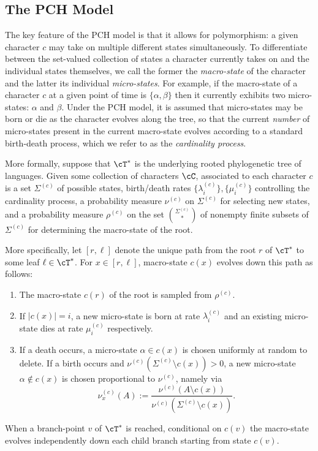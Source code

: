 \subsection{The PCH Model}

The key feature of the PCH model is that it allows for polymorphism: a given character $c$ may take on multiple different
states simultaneously. To differentiate between the set-valued collection of states a character currently takes on and the individual
states themselves, we call the former the \textit{macro-state} of the character and the latter its individual \textit{micro-states}. For
example, if the macro-state of a character $c$ at a given point of time is $\{\alpha, \beta\}$ then it currently exhibits two micro-states: $\alpha$ and  $\beta$.
Under the PCH model, it is assumed that micro-states may be born or die as the character evolves along the tree, so that the current
\textit{number} of micro-states present in the current macro-state evolves according to a standard birth-death process, which we refer to as the \textit{cardinality process}.

More formally, suppose that $\cT^*$ is the underlying rooted phylogenetic tree of languages. Given some collection of characters $\cC$,
associated to each character $c$ is a set $\Sigma^{(c)}$
of possible states, birth/death rates $\{\lambda_i^{(c)}\}, \{\mu_i^{(c)}\}$ controlling the cardinality process, a probability measure $\nu^{(c)}$
on $\Sigma^{(c)}$ for selecting new states, and a probability measure $\rho^{(c)}$ on the set ${\Sigma^{(c)} \choose *}$ of nonempty finite subsets of $\Sigma^{(c)}$ for
determining the macro-state of the root.

More specifically, let $[r, \ell]$ denote the unique path from the root $r$ of $\cT^*$ to some leaf $\ell \in \cT^*$. For $x \in [r, \ell]$,
macro-state $c(x)$ evolves down this path as follows:
%
\begin{enumerate}[label=(\roman*)]
    \item The macro-state $c(r)$ of the root is sampled from $\rho^{(c)}$.
    \item If $|c(x)| = i$, a new micro-state is born at rate $\lambda_i^{(c)}$ and an existing micro-state dies at rate $\mu_i^{(c)}$ respectively.
    \item If a death occurs, a micro-state $\alpha \in c(x)$ is chosen uniformly at random to delete. If a birth occurs and $\nu^{(c)}(\Sigma^{(c)} \setminus c(x)) > 0$, a new micro-state $\alpha \notin c(x)$ is chosen proportional to $\nu^{(c)}$, namely via
                \[\nu_x^{(c)}(A) := \frac{\nu^{(c)}(A \setminus c(x))}{\nu^{(c)}(\Sigma^{(c)} \setminus c(x))}.\]
\end{enumerate}
%
When a branch-point $v$ of $\cT^*$ is reached, conditional on $c(v)$ the macro-state evolves independently down each child branch starting from
state $c(v)$.

